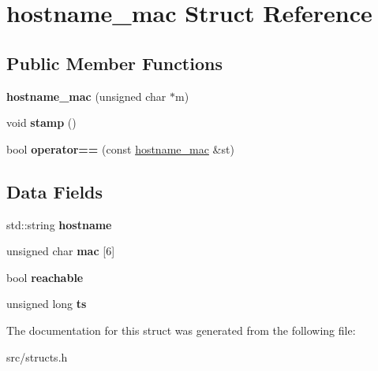 \hypertarget{structhostname__mac}{\section{hostname\-\_\-mac Struct Reference}
\label{structhostname__mac}
}
\subsection*{Public Member Functions}
\begin{DoxyCompactItemize}
\item 
\hypertarget{structhostname__mac_ac84142944e5ac704e488946ca00cc71c}{{\bfseries hostname\-\_\-mac} (unsigned char $\ast$m)}\label{structhostname__mac_ac84142944e5ac704e488946ca00cc71c}

\item 
\hypertarget{structhostname__mac_a2e519ca449d73a53eb05b8261c4888df}{void {\bfseries stamp} ()}\label{structhostname__mac_a2e519ca449d73a53eb05b8261c4888df}

\item 
\hypertarget{structhostname__mac_a3502a0d7e1a90729f3841e292548c11b}{bool {\bfseries operator==} (const \hyperlink{structhostname__mac}{hostname\-\_\-mac} \&st)}\label{structhostname__mac_a3502a0d7e1a90729f3841e292548c11b}

\end{DoxyCompactItemize}
\subsection*{Data Fields}
\begin{DoxyCompactItemize}
\item 
\hypertarget{structhostname__mac_ac550a99d7eac1467f9e16f8b0e8df6bd}{std\-::string {\bfseries hostname}}\label{structhostname__mac_ac550a99d7eac1467f9e16f8b0e8df6bd}

\item 
\hypertarget{structhostname__mac_a8b5cebe755b3f82251ef197f7805aae3}{unsigned char {\bfseries mac} \mbox{[}6\mbox{]}}\label{structhostname__mac_a8b5cebe755b3f82251ef197f7805aae3}

\item 
\hypertarget{structhostname__mac_a12e6eac4d7e2d23df9f222a68a361915}{bool {\bfseries reachable}}\label{structhostname__mac_a12e6eac4d7e2d23df9f222a68a361915}

\item 
\hypertarget{structhostname__mac_ad0ecf7f66f93ecd39232e47742a82f32}{unsigned long {\bfseries ts}}\label{structhostname__mac_ad0ecf7f66f93ecd39232e47742a82f32}

\end{DoxyCompactItemize}


The documentation for this struct was generated from the following file\-:\begin{DoxyCompactItemize}
\item 
src/structs.\-h\end{DoxyCompactItemize}
